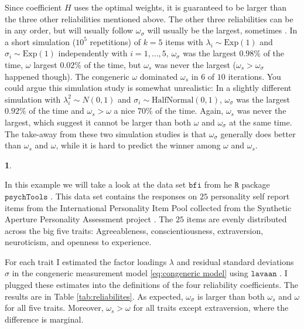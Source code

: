 \documentclass{article}
\theoremstyle{plain}
\theoremstyle{plain}
\theoremstyle{definition}
\theoremstyle{remark}
\theoremstyle{definition}
\newtheorem{example}[thm]{\protect\examplename}
\theoremstyle{plain}
\theoremstyle{plain}
\theoremstyle{definition}
\providecommand{\examplename}{Example}
\begin{document}
Since coefficient $H$ uses the optimal weights, it is guaranteed to
be larger than the three other reliabilities mentioned above. The
other three reliabilities can be in any order, but will usually follow
$\omega_{\sigma}$ will usually be the largest, sometimes . In a short
simulation ($10^{5}$ repetitions) of $k=5$ items with $\lambda_{i}\sim \textrm{Exp}(1)$
and $\sigma_{i}\sim \textrm{Exp}(1)$ independently with $i=1,\ldots,5$, $\omega_{\sigma}$
was the largest $0.98\%$ of the time, $\omega$ largest $0.02\%$
of the time, but $\omega_{s}$ was never the largest ($\omega_{s}>\omega_{\sigma}$
happened though). The congeneric $\omega$ dominated $\omega_{s}$
in $6$ of $10$ iterations. You could argue this simulation study
is somewhat unrealistic: In a slightly different simulation with $\lambda_{i}^{2}\sim N(0,1)$
and $\sigma_{i}\sim \textrm{HalfNormal}(0,1)$, $\omega_{\sigma}$ was the
largest $0.92\%$ of the time and $\omega_{s}>\omega$ a nice $70\%$
of the time. Again, $\omega_{s}$ was never the largest, which suggest
it cannot be larger than both $\omega$ and $\omega_{\sigma}$ at
the same time. The take-away from these two simulation studies is
that $\omega_{\sigma}$ generally does better than $\omega_{s}$ and
$\omega$, while it is hard to predict the winner among $\omega$
and $\omega_{s}$. 

\begin{example}
\label{exa:reliabilities}


In this example we will take a look at the data set $\texttt{bfi}$ from he $\texttt{R}$ \citep{Team2013-tt} package $\texttt{psychTools}$ \citep{Revelle2019-te}. This data set contains the responses on $25$ personality self report items from the International Personality Item Pool \citep{Goldberg1999-iz} collected from the Synthetic Aperture Personality Assessment project \citep{Revelle2016-ez}. The $25$ items are evenly distributed across the big five traits: Agreeableness, conscientiousness, extraversion, neuroticism, and openness to experience. 

For each trait I estimated the factor loadings $\lambda$ and residual standard deviations $\sigma$ in the congeneric measurement model \eqref{eq:congeneric model} using  $\texttt{lavaan}$ \citep{Rosseel2012-yg}. I plugged these estimates into the definitions of the four reliability coefficients. The results are in Table \ref{tab:reliabilites}. As expected, $\omega_\sigma$ is larger than both $\omega_s$ and $\omega$ for all five traits. Moreover, $\omega_s > \omega$ for all traits except extraversion, where the difference is marginal. 
\end{example}
\end{document}
